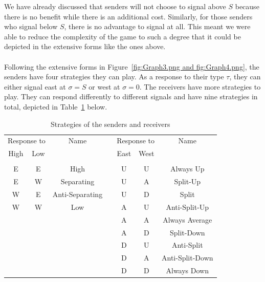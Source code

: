 \documentclass[a4paper,10pt]{article}
\numberwithin{equation}{section}
\begin{document}
We have already discussed that senders will not choose to signal above $S$ because there is no benefit while there is an additional cost. Similarly, for those senders who signal below $S$, there is no advantage to signal at all. This meant we were able to reduce the complexity of the game to such a degree that it could be depicted in the extensive forms like the ones above.\\
\\
Following the extensive forms in Figure~\ref{fig:Graph3.png and fig:Graph4.png}, the senders have four strategies they can play. As a response to their type $\tau$, they can either signal east at $\sigma=S$ or west at $\sigma=0$. The receivers have more strategies to play. They can respond differently to different signals and have nine strategies in total, depicted in Table~\ref{tab:Strategies} below.\\

\begin{table}[h]
\begin{center}
\begin{tabular}{c|c|ccc|c|c}
\multicolumn{2}{c|}{Response to}&Name& \hspace{1.5cm} &\multicolumn{2}{c|}{Response to}&Name\\
High&Low&&&East&West&\\
\cline{1-3}
\cline{5-7}
&&&&&&\\[-.3cm]
E&E&High&&U&U&Always Up\\
E&W&Separating&&U&A&Split-Up\\
W&E&Anti-Separating&&U&D&Split\\
W&W&Low&&A&U&Anti-Split-Up\\
\multicolumn{3}{c}{}&&A&A&Always Average\\
\multicolumn{3}{c}{}&&A&D&Split-Down\\
\multicolumn{3}{c}{}&&D&U&Anti-Split\\
\multicolumn{3}{c}{}&&D&A&Anti-Split-Down\\
\multicolumn{3}{c}{}&&D&D&Always Down\\
\end{tabular}
\end{center}
\caption{Strategies of the senders and receivers}
\label{tab:Strategies}
\end{table}
\end{document}
